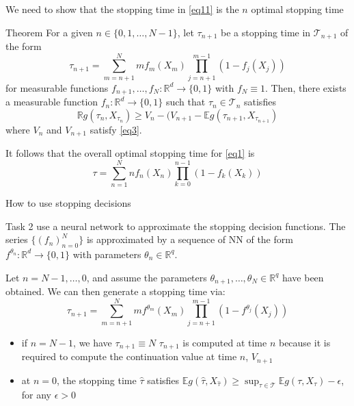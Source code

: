 \documentclass[9pt]{beamer} %
\newcommand{\gooditem}[1]{\setbeamercolor{item}{fg=darkred}\item #1}
\begin{document}
\begin{frame}{}
We need to show that the stopping time in \ref{eq11} is the $n$ optimal stopping time

\medskip
\begin{alertblock}{Theorem \hyperlink{supplemental}{}}
For a given $n \in \{ 0, 1, \ldots, N-1\}$, let $\tau_{n+1}$ be a stopping time in $\mathcal{T}_{n+1}$ of the form
\begin{equation}\label{eq12}
    \tau_{n+1} = \sum_{m=n+1}^N m f_m(X_m) \prod_{j=n+1}^{m-1} (1-f_j(X_j))
\end{equation}
for measurable functions $f_{n+1}, \ldots, f_N : \mathbb{R}^d \rightarrow \{0,1\}$ with $f_N \equiv 1$. Then, there exists a measurable function $f_n: \mathbb{R}^d \rightarrow \{0,1\}$ such that $\tau_n \in \mathcal{T}_n$ satisfies 
\begin{equation}\label{eq13}
    \mathbb{R}g(\tau_n, X_{\tau_n}) \geq V_n - (V_{n+1}-\mathbb{E}g(\tau_{n+1}, X_{\tau_{n+1}})
\end{equation}
where $V_n$ and $V_{n+1}$ satisfy \ref{eq3}.
\end{alertblock}

It follows that the overall optimal stopping time for \ref{eq1} is 
\begin{equation}\label{eq14}
    \tau = \sum_{n=1}^N n f_n(X_n) \prod_{k=0}^{n-1} (1-f_k(X_k))
\end{equation}

\end{frame}


\begin{frame}{How to use stopping decisions}

\begin{block}{Task 2}
\cite{becker2019deep} use a neural network to approximate the stopping decision functions. The series $\{ (f_n)_{n=0}^N\}$ is approximated by a sequence of NN of the form $f^{\theta_n}: \mathbb{R}^d \rightarrow \{0,1\}$ with parameters $\theta_n \in \mathbb{R}^q$.
\end{block}

Let $n=N-1, \ldots, 0$, and assume the parameters $\theta_{n+1}, \ldots, \theta_N \in \mathbb{R}^q$ have been obtained. We can then generate a stopping time via:
\begin{equation}\label{eq15}
    \tau_{n+1}= \sum_{m=n+1}^N m f^{\theta_m}(X_m) \prod_{j=n+1}^{m-1} (1-f^{\theta_j}(X_j))
\end{equation}
\begin{itemize}
    \gooditem $\tau_{n+1}$ gives an expected value $\mathbb{E}g(\tau_{n+1}, X_{\tau_{n+1}})$ close to the optimum $V_{n+1}$
    \gooditem if $n=N-1$, we have $\tau_{n+1} \equiv N$
    \gooditem $\tau_{n+1}$ is computed at time $n$ because it is required to compute the continuation value at time $n$, $V_{n+1}$
    \gooditem at $n=0$, the stopping time $\hat{\tau}$ satisfies $\mathbb{E}g(\hat{\tau}, X_{\hat{\tau}}) \geq \sup_{\tau \in \mathcal{T}} \mathbb{E}g(\tau, X_{\tau})- \epsilon $, for any $\epsilon >0$
\end{itemize}
\end{frame}
\end{document}
